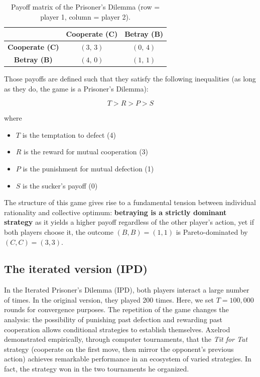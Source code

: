 \documentclass[11pt, a4paper]{article}
\begin{document}
\begin{table}[H]
  \centering
  \caption{Payoff matrix of the Prisoner's Dilemma (row = player 1, column = player 2).}
  \label{tab:payoff}
  \begin{tabular}{c|cc}
    \toprule
                   & \textbf{Cooperate (C)} & \textbf{Betray (B)} \\
    \midrule
    \textbf{Cooperate (C)} & $(3,\, 3)$ & $(0,\, 4)$ \\
    \textbf{Betray (B)}    & $(4,\, 0)$ & $(1,\, 1)$ \\
    \bottomrule
  \end{tabular}
\end{table}

Those payoffs are defined such that they satisfy the following inequalities (as long as they do, the game is a Prisoner's Dilemma):

\begin{equation}
    T > R > P > S
\end{equation}

where

\begin{itemize}
    \item $T$ is the temptation to defect (4)
    \item $R$ is the reward for mutual cooperation (3)
    \item $P$ is the punishment for mutual defection (1)
    \item $S$ is the sucker's payoff (0)
\end{itemize}

The structure of this game gives rise to a fundamental tension between individual rationality and collective optimum: \textbf{betraying is a strictly dominant strategy} as it yields a higher payoff regardless of the other player's action, yet if both players choose it, the outcome $(B, B) = (1,1)$ is Pareto-dominated by $(C, C) = (3,3)$.

\subsection{The iterated version (IPD)}

In the Iterated Prisoner's Dilemma (IPD), both players interact a large number of times. In the original version, they played 200 times. Here, we set $T = 100{,}000$ rounds for convergence purposes. The repetition of the game changes the analysis: the possibility of punishing past defection and rewarding past cooperation allows conditional strategies to establish themselves. Axelrod demonstrated empirically, through computer tournaments, that the \textit{Tit for Tat} strategy (cooperate on the first move, then mirror the opponent's previous action) achieves remarkable performance in an ecosystem of varied strategies. In fact, the strategy won in the two tournaments he organized.
\end{document}
